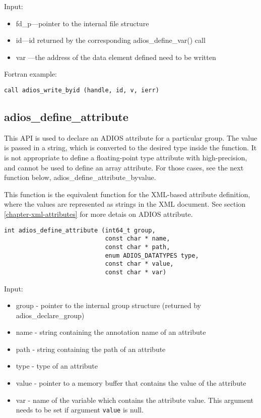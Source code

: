 Input:
\begin{itemize}
\item fd\_p---pointer to the internal file structure
\item id---id returned by the corresponding adios\_define\_var() call
\item var ---the address of the data element defined need to be written
\end{itemize}

Fortran example: 
\begin{lstlisting}[alsolanguage=Fortran,caption={},label={}]
call adios_write_byid (handle, id, v, ierr)
\end{lstlisting}


\subsection{adios\_define\_attribute}

This API is used to declare an ADIOS attribute for a particular group. The value is passed in a string, which is converted to the desired type inside the function. It is not appropriate to define a floating-point type attribute with high-precision, and cannot be used to define an array attribute. For those cases, see the next function below, 
adios\_define\_attribute\_byvalue. 

This function is the equivalent function for the XML-based attribute definition, where the values are represented as strings in the XML document. See section \ref{chapter-xml-attributes} for more detais on ADIOS attribute.

\begin{lstlisting}[alsolanguage=C,caption={},label={}]
int adios_define_attribute (int64_t group,
                            const char * name, 
                            const char * path,
                            enum ADIOS_DATATYPES type,
                            const char * value,
                            const char * var)
\end{lstlisting}

Input:
\begin{itemize}
\item group - pointer to the internal group structure (returned by adios\_declare\_group)

\item name - string containing the annotation name of an attribute

\item path - string containing the path of an attribute

\item type  - type of an attribute

\item value - pointer to a memory buffer that contains the value of the attribute

\item var - name of the variable which contains the attribute value. This argument needs 
to be set if argument \verb+value+ is null.  
\end{itemize}

